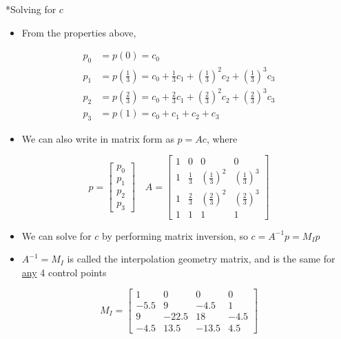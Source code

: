 \documentclass[12pt, landscape]{article}
\makeatletter
\renewcommand{\subsection}{
  \@startsection{subsection}{2}{0pt}{1ex}{1.2ex} {\raggedleft\normalfont\normalsize\bfseries\fbox}}
\makeatother
\begin{document}
\begin{multicols*}{3}
  \subsection*{Solving for $c$}
    \begin{itemize}[leftmargin=*]
      \item From the properties above,
    \end{itemize}
    \vspace{-0.3cm}
    \begin{align*}
      p_0 &= p(0) = c_0 \\
      p_1 &= p \left( \frac{1}{3} \right) = c_0 + \frac{1}{3} c_1 + \left( \frac{1}{3} \right)^2 c_2 + \left( \frac{1}{3} \right)^3 c_3 \\
      p_2 &= p \left( \frac{2}{3} \right) = c_0 + \frac{2}{3} c_1 + \left( \frac{2}{3} \right)^2 c_2 + \left( \frac{2}{3} \right)^3 c_3 \\
      p_3 &= p(1) = c_0 + c_1 + c_2 + c_3
    \end{align*}
    \begin{itemize}[leftmargin=*]
      \item We can also write in matrix form as $p = Ac$, where
    \end{itemize}
    \[
      p = \begin{bmatrix} p_0 \\ p_1 \\ p_2 \\ p_3 \end{bmatrix} \quad
      A = \begin{bmatrix}
        1 & 0 & 0 & 0 \\
        1 & \frac{1}{3} & \left( \frac{1}{3} \right)^2 & \left( \frac{1}{3} \right)^3 \\
        1 & \frac{2}{3} & \left( \frac{2}{3} \right)^2 & \left( \frac{2}{3} \right)^3 \\
        1 & 1 & 1 & 1
      \end{bmatrix}
    \]
    \begin{itemize}[leftmargin=*]
      \item We can solve for $c$ by performing matrix inversion, so $c = A^{-1} p = M_I p$
      \item $A^{-1} = M_I$ is called the interpolation geometry matrix, and is the same for \uline{any} 4 control points
    \end{itemize}
    \[
      M_I = \begin{bmatrix}
        1 & 0 & 0 & 0 \\
        -5.5 & 9 & -4.5 & 1 \\
        9 & -22.5 & 18 & -4.5 \\
        -4.5 & 13.5 & -13.5 & 4.5
      \end{bmatrix}
    \]

\end{multicols*}
\end{document}
